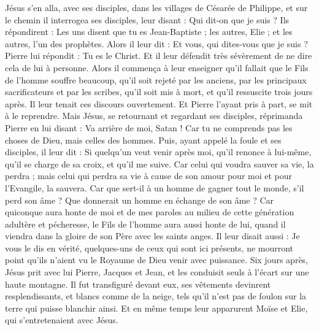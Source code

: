 \begin{multicols}{2}
Jésus s’en alla, avec ses disciples, dans les villages de Césarée de Philippe, et sur le chemin il interrogea ses disciples, leur disant : Qui dit-on que je suis ?
Ils répondirent : Les uns disent que tu es Jean-Baptiste ; les autres, Elie ; et les autres, l'un des prophètes.
Alors il leur dit : Et vous, qui dites-vous que je suis ? Pierre lui répondit : Tu es le Christ.
Et il leur défendit très sévèrement de ne dire cela de lui à personne.
Alors il commença à leur enseigner qu'il fallait que le Fils de l'homme souffre beaucoup, qu'il soit rejeté par les anciens, par les principaux sacrificateurs et par les scribes, qu'il soit mis à mort, et qu'il ressuscite trois jours après.
Il leur tenait ces discours ouvertement. Et Pierre l’ayant pris à part, se mit à le reprendre.
Mais Jésus, se retournant et regardant ses disciples, réprimanda Pierre en lui disant : Va arrière de moi, Satan ! Car tu ne comprends pas les choses de Dieu, mais celles des hommes.
Puis, ayant appelé la foule et ses disciples, il leur dit : Si quelqu’un veut venir après moi, qu'il renonce à lui-même, qu'il se charge de sa croix, et qu’il me suive.
Car celui qui voudra sauver sa vie, la perdra ; mais celui qui perdra sa vie à cause de son amour pour moi et pour l'Evangile, la sauvera.
Car que sert-il à un homme de gagner tout le monde, s'il perd son âme ?
Que donnerait un homme en échange de son âme ?
Car quiconque aura honte de moi et de mes paroles au milieu de cette génération adultère et pécheresse, le Fils de l'homme aura aussi honte de lui, quand il viendra dans la gloire de son Père avec les saints anges.
\VerseOne{}Il leur disait aussi : Je vous le dis en vérité, quelques-uns de ceux qui sont ici présents, ne mourront point qu’ils n’aient vu le Royaume de Dieu venir avec puissance{}.
Six jours après, Jésus prit avec lui Pierre, Jacques et Jean, et les conduisit seuls à l'écart sur une haute montagne. Il fut transfiguré devant eux,
ses vêtements devinrent resplendissants, et blancs comme de la neige, tels qu'il n’est pas de foulon sur la terre qui puisse blanchir ainsi.
Et en même temps leur apparurent Moïse et Elie, qui s’entretenaient avec Jésus.

\end{multicols}
